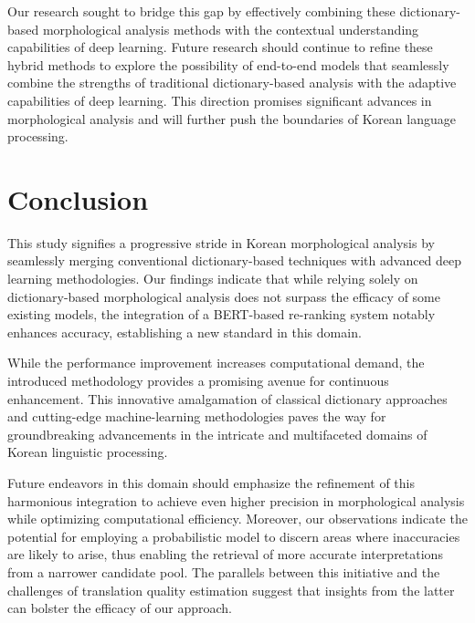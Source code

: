 \documentclass[AMS,STIX2COL]{WileyNJD-v2}
\begin{document}
    Our research sought to bridge this gap by effectively combining these dictionary-based morphological analysis methods with the contextual understanding capabilities of deep learning.
    Future research should continue to refine these hybrid methods to explore the possibility of end-to-end models that seamlessly combine the strengths of traditional dictionary-based analysis with the adaptive capabilities of deep learning.
    This direction promises significant advances in morphological analysis and will further push the boundaries of Korean language processing.


    \section{Conclusion}\label{sec:conclusion}

    This study signifies a progressive stride in Korean morphological analysis by seamlessly merging conventional dictionary-based techniques with advanced deep learning methodologies.
    Our findings indicate that while relying solely on dictionary-based morphological analysis does not surpass the efficacy of some existing models, the integration of a BERT-based re-ranking system notably enhances accuracy, establishing a new standard in this domain.

    While the performance improvement increases computational demand, the introduced methodology provides a promising avenue for continuous enhancement.
    This innovative amalgamation of classical dictionary approaches and cutting-edge machine-learning methodologies paves the way for groundbreaking advancements in the intricate and multifaceted domains of Korean linguistic processing.

    Future endeavors in this domain should emphasize the refinement of this harmonious integration to achieve even higher precision in morphological analysis while optimizing computational efficiency.
    Moreover, our observations indicate the potential for employing a probabilistic model to discern areas where inaccuracies are likely to arise, thus enabling the retrieval of more accurate interpretations from a narrower candidate pool.
    The parallels between this initiative and the challenges of translation quality estimation suggest that insights from the latter can bolster the efficacy of our approach.


    
\end{document}
